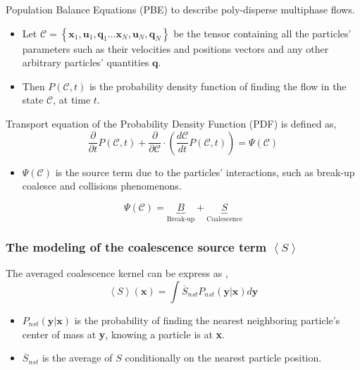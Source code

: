 \documentclass{sintefbeamer}
\newcommand{\avg}[1]{\left<#1\right>}
\newcommand{\nstavg}[1]{\overline{#1}_{nst}}
\newcommand{\pddt}{\frac{\partial}{\partial t}}
\begin{document}
\begin{frame}{Population Balance Equations (PBE) to describe poly-disperse multiphase flows.}
  \begin{definition}
    \begin{itemize}
      \item Let $\mathscr{C} =\left\{\textbf{x}_1,\textbf{u}_1, \textbf{q}_1\ldots\textbf{x}_N,\textbf{u}_N, \textbf{q}_N\right\}$ be the tensor containing all the particles' parameters such as their velocities and positions vectors and any other arbitrary particles' quantities $\textbf{q}$. 
      \item Then $P(\mathscr{C},t)$ is the probability density function of finding the flow in the state $\mathscr{C}$, at time $t$. 
    \end{itemize}
  \end{definition}
  Transport equation of the Probability Density Function (PDF) is defined as,
  \begin{equation*}
    \pddt P(\mathscr{C},t)
    + \frac{\partial}{\partial \mathscr{C}} \cdot
    \left(
        \frac{d\mathscr{C}}{dt}  
        P(\mathscr{C},t)
    \right)
    = \Psi(\mathscr{C})
    \label{eq:dt_P}
\end{equation*}

  \begin{itemize}
    \item $\Psi(\mathscr{C})$ is the source term due to the particles' interactions, such as break-up coalesce and collisions phenomenons. 
  \end{itemize}
  \begin{equation*}
    \Psi(\mathscr{C}) =
    \underbrace{B}_{\text{Break-up}}
    +\underbrace{S}_{\text{Coalescence}}
  \end{equation*}
\end{frame}
\begin{frame}
  \frametitle{The modeling of the coalescence source term $\avg{S}$}
  The averaged coalescence kernel can be express as \citep{zhang2021ensemble},
  \begin{equation*}
    \avg{S}(\textbf{x}) = \int \nstavg{S}P_{nst}(\textbf{y}|\textbf{x})d\textbf{y}
  \end{equation*}

  \begin{itemize}
    \item $P_{nst}(\textbf{y}|\textbf{x}) $ is the probability of finding the nearest neighboring particle's center of mass at \textbf{y}, knowing a particle is at \textbf{x}.
    \item $\nstavg{S}$ is the average of $S$ conditionally on the nearest particle position. 
  \end{itemize}
\end{frame}
\end{document}
